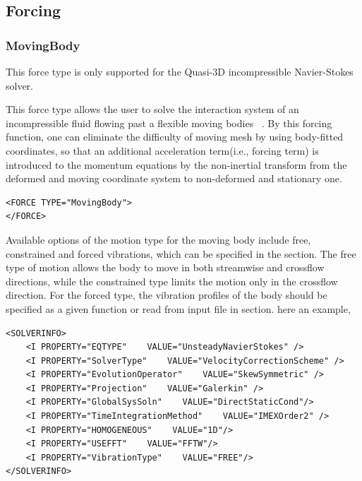 \subsection{Forcing}
\subsubsection{MovingBody}

\begin{notebox}
This force type is only supported for the Quasi-3D incompressible Navier-Stokes solver.
\end{notebox}

This force type allows the user to solve the interaction system of an incompressible fluid flowing past a flexible moving bodies ~\cite{NeKa97}. By this forcing function, one can eliminate the difficulty of moving mesh by using body-fitted coordinates, so that an additional acceleration term(i.e., forcing term) is introduced to the momentum equations by the non-inertial transform from the deformed and moving coordinate system to non-deformed and stationary one.

\begin{lstlisting}[style=XMLStyle]
<FORCE TYPE="MovingBody">
</FORCE>
\end{lstlisting}

Available options of the motion type for the moving body include free, constrained and forced vibrations, which can be specified in the  section. The free type of motion allows the body to move in both streamwise and crossflow directions, while the constrained type limits the motion only in the crossflow direction. For the forced type, the vibration profiles of the body should be specified as a given function or read from input file in  section. here an example,

\begin{lstlisting}[style=XMLStyle]
<SOLVERINFO>
    <I PROPERTY="EQTYPE"    VALUE="UnsteadyNavierStokes" />
    <I PROPERTY="SolverType"    VALUE="VelocityCorrectionScheme" />
    <I PROPERTY="EvolutionOperator"    VALUE="SkewSymmetric" />
    <I PROPERTY="Projection"    VALUE="Galerkin" />
    <I PROPERTY="GlobalSysSoln"    VALUE="DirectStaticCond"/>
    <I PROPERTY="TimeIntegrationMethod"    VALUE="IMEXOrder2" />
    <I PROPERTY="HOMOGENEOUS"    VALUE="1D"/>
    <I PROPERTY="USEFFT"    VALUE="FFTW"/>
    <I PROPERTY="VibrationType"    VALUE="FREE"/>
</SOLVERINFO>
\end{lstlisting}

